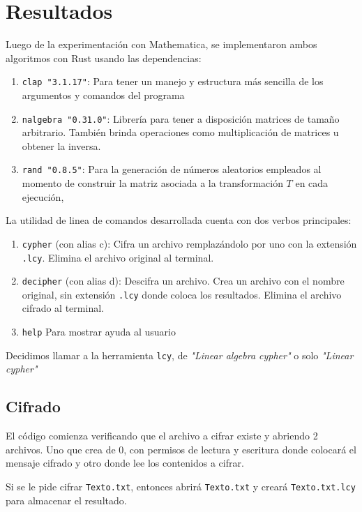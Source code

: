 \documentclass[a4paper]{article}
\begin{document}
\newpage
\section{Resultados}

Luego de la experimentación con Mathematica, se implementaron ambos algoritmos
con Rust usando las dependencias:

\begin{enumerate}
\item \texttt{clap "3.1.17"}: Para tener un manejo y estructura más sencilla de
los argumentos y comandos del programa
\item \texttt{nalgebra "0.31.0"}: Librería para tener a disposición matrices de
tamaño arbitrario. También brinda operaciones como multiplicación de matrices u
obtener la inversa.
\item \texttt{rand "0.8.5"}: Para la generación de números aleatorios empleados
al momento de construir la matriz asociada a la transformación $T$ en cada
ejecución,
\end{enumerate}

La utilidad de linea de comandos desarrollada cuenta con dos verbos
principales:

\begin{enumerate}
\item \texttt{cypher} (con alias c): Cifra un archivo remplazándolo por uno con
la extensión \texttt{.lcy}. Elimina el archivo original al terminal.
\item \texttt{decipher} (con alias d): Descifra un archivo. Crea un archivo con
el nombre original, sin extensión \texttt{.lcy} donde coloca los resultados.
Elimina el archivo cifrado al terminal.
    \item \texttt{help} Para mostrar ayuda al usuario
\end{enumerate}

Decidimos llamar a la herramienta \texttt{lcy}, de \textit{"Linear algebra
cypher"} o solo \textit{"Linear cypher"}

\subsection{Cifrado}

El código comienza verificando que el archivo a cifrar existe y abriendo 2
archivos.
Uno
que
crea
de
0,
con
permisos
de
lectura y escritura donde
colocará
el
mensaje
cifrado
y
otro donde lee los contenidos a cifrar.

Si se le pide cifrar \texttt{Texto.txt}, entonces abrirá \texttt{Texto.txt} y
creará \texttt{Texto.txt.lcy} para almacenar el resultado.
\end{document}
